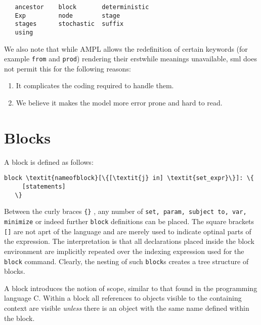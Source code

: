 \documentclass[10pt,a4paper]{book}
\begin{document}
\begin{verbatim}
   ancestor    block       deterministic 
   Exp         node        stage 
   stages      stochastic  suffix 
   using 
\end{verbatim}

We also note that while AMPL allows the redefinition of certain keywords
(for example {\tt from} and {\tt prod}) rendering their erstwhile meanings
unavailable, sml does not permit this for the following reasons:
\begin{enumerate}
   \item It complicates the coding required to handle them.
   \item We believe it makes the model more error prone and hard to read.
\end{enumerate}

\section{Blocks}
A block is defined as follows:

\begin{Verbatim}[commandchars=\\\{\}]
   block \textit{nameofblock}[\{[\textit{j} in] \textit{set_expr}\}]: \{
     [statements]
   \}
\end{Verbatim}
Between the curly braces {\tt \{\}} , any number of {\tt set, param,
subject to, var, minimize} or indeed further {\tt block} definitions can be
placed. The square brackets {\tt []} are not aprt of the language and are
merely used to indicate optinal parts of the expression. The interpretation is
that all declarations placed inside the block environment are implicitly
repeated over the indexing expression used for the
{\tt block} command. Clearly, the nesting of such {\tt block}s creates a tree
structure of blocks.

A block introduces the notion of scope, similar to that found in the programming
language C. Within a block all references to objects visible to the containing
context are visible {\it unless} there is an object with the same name defined
within the block.
\end{document}
